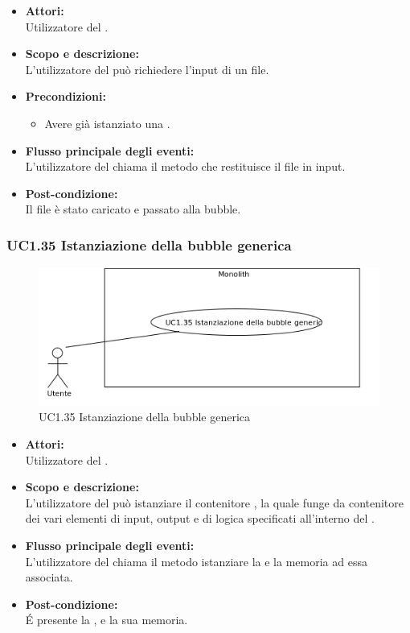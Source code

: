 \begin{itemize}
	\item \textbf{Attori:}
	\\Utilizzatore del .
	\item \textbf{Scopo e descrizione:} 
	\\L’utilizzatore del  può richiedere l’input di un file.
	\item \textbf{Precondizioni:}
	\begin{itemize}
		\item Avere già istanziato una .
	\end{itemize}
	\item \textbf{Flusso principale degli eventi:}
	\\L’utilizzatore del  chiama il metodo che restituisce il file in input.
	\item \textbf{Post-condizione:}
	\\Il file è stato caricato e passato alla bubble.
\end{itemize}

\subsubsection{UC1.35 Istanziazione della bubble generica} \label{UC1.35}

\begin{figure}[H]
	\centering
	\includegraphics[width=15cm]{../../documenti/AnalisiDeiRequisiti/Diagrammi_img/uc1_35.png}
	\caption{UC1.35 Istanziazione della bubble generica}
\end{figure}

\begin{itemize}
	\item \textbf{Attori:}
	\\Utilizzatore del .
	\item \textbf{Scopo e descrizione:} 
	\\L’utilizzatore del  può istanziare il contenitore , la quale funge da contenitore dei vari elementi di input, output e di logica specificati all'interno del .
	\item \textbf{Flusso principale degli eventi:}
	\\L’utilizzatore del  chiama il metodo istanziare la  e la memoria ad essa associata.
	\item \textbf{Post-condizione:}
	\\É presente la , e la sua memoria.
\end{itemize}

